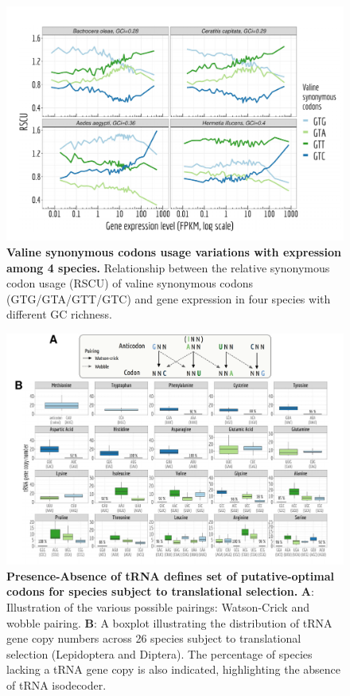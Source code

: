     
\begin{figure}[t]
    \centering                                                                            
    \includegraphics[width=\textwidth]{Figure11_supp.pdf}
    \caption[Valine synonymous codons usage variations with expression among 4 species]{\textbf{Valine synonymous codons usage variations with expression among 4 species.} Relationship between the relative synonymous codon usage (RSCU) of valine synonymous codons (GTG/GTA/GTT/GTC) and gene expression in four species with different GC richness.} 
    \label{suppfig:CU11}
\end{figure}


\begin{figure}[t]
    \centering                                                                            
    \includegraphics[width=\textwidth]{Figure12_supp.pdf}
    \caption[Presence-Absence of tRNA defines set of putative-optimal codons for species subject to translational selection]{\textbf{Presence-Absence of tRNA defines set of putative-optimal codons for species subject to translational selection.} \textbf{A}: Illustration of the various possible pairings: Watson-Crick and wobble pairing. \textbf{B}: A boxplot illustrating the distribution of tRNA gene copy numbers across 26 species subject to translational selection (Lepidoptera and Diptera). The percentage of species lacking a tRNA gene copy is also indicated, highlighting the absence of tRNA isodecoder.} 
    \label{suppfig:CU12}
\end{figure}
